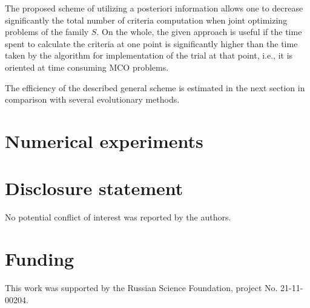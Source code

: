 \documentclass[]{interact}
\theoremstyle{plain}%
\theoremstyle{definition}
\theoremstyle{remark}
\begin{document}
The proposed scheme of utilizing a posteriori information allows one to decrease significantly the total number of criteria computation when joint optimizing problems of the family $S$. On the whole, the given approach is useful  if the time spent to calculate the criteria at one point is significantly higher than the time taken by the algorithm for implementation of the trial at that point, i.e., it is oriented at time consuming MCO problems.
 
The efficiency of the described general scheme is estimated in the next section in comparison with several evolutionary methods. 




\section{Numerical experiments}


\section*{Disclosure statement}

No potential conflict of interest was reported by the authors.

\section*{Funding}

This work was supported by the Russian Science Foundation, project No. 21-11-00204.





\end{document}
